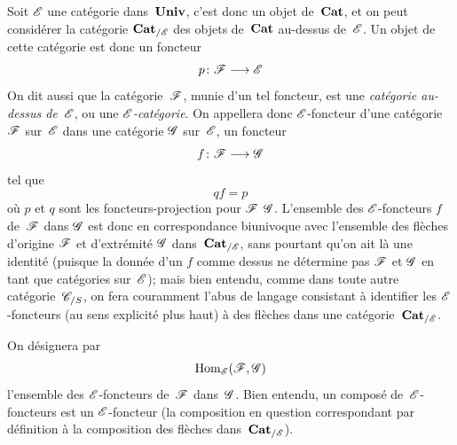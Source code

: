 Soit $\cal{E}$ une cat\'egorie dans~$\mathbf{Univ}$, c'est donc un objet
de~$\mathbf{Cat}$, et on peut consid\'erer la cat\'egorie
$\Cat_{/\cal{E}}$
\label{indnot:fh}des \og objets de~$\mathbf{Cat}$ au-dessus de~$\cal{E}$\fg. Un objet de cette
cat\'egorie est donc un foncteur
$$
p\colon \cal{F}\to\cal{E}
$$
On dit aussi que la cat\'egorie~$\cal{F}$, munie d'un tel foncteur,
est une \emph{catégorie au-dessus de}~$\cal{E}$, ou une
$\cal{E}$\emph{-catégorie}. On appellera donc $\cal{E}$-foncteur
d'une cat\'egorie $\cal{F}$ sur~$\cal{E}$ dans une cat\'egorie
$\cal{G}$ sur~$\cal{E}$, un foncteur
$$
f\colon\cal{F}\to\cal{G}
$$
tel que
$$
qf=p
$$
o\`u $p$ et $q$ sont les foncteurs-projection pour $\cal{F}$
\resp $\cal{G}$. L'ensemble des $\cal{E}$-foncteurs $f$ de~$\cal{F}$
dans $\cal{G}$ est donc en correspondance biunivoque avec l'ensemble
des fl\`eches d'origine $\cal{F}$ et d'extr\'emit\'e $\cal{G}$
dans~$\Cat_{/\cal{E}}$, sans
pourtant qu'on ait l\`a une identit\'e (puisque la donn\'ee d'un
$f$ comme dessus ne d\'etermine pas $\cal{F}$ et $\cal{G}$ en tant
que cat\'egories sur~$\cal{E}$); mais bien entendu, comme dans toute
autre cat\'egorie~$\cal{C}_{/S}$, on fera couramment l'abus de
langage consistant \`a identifier les $\cal{E}$-foncteurs (au sens
explicit\'e plus haut) \`a des fl\`eches dans une
cat\'egorie~$\Cat_{/\cal{E}}$.

On d\'esignera par
$$
\Hom_{\cal{E}}(\cal{F},\cal{G})
$$
l'ensemble des $\cal{E}$-foncteurs de~$\cal{F}$ dans~$\cal{G}$. Bien
entendu, un compos\'e de~$\cal{E}$-foncteurs est un
$\cal{E}$-foncteur (la composition en question correspondant par
d\'efinition \`a la composition des fl\`eches
dans~$\Cat_{/\cal{E}}$).

